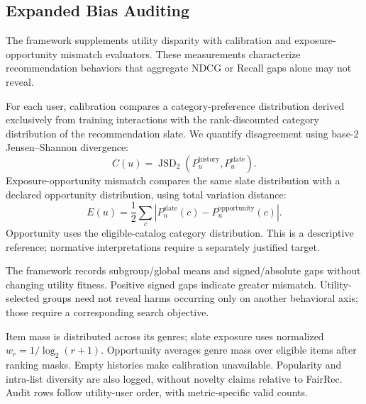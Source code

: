 \subsection{Expanded Bias Auditing}
The framework supplements utility disparity with calibration and exposure-opportunity mismatch evaluators. These measurements characterize recommendation behaviors that aggregate NDCG or Recall gaps alone may not reveal.

For each user, calibration compares a category-preference distribution derived exclusively from training interactions with the rank-discounted category distribution of the recommendation slate. We quantify disagreement using base-2 Jensen--Shannon divergence:
\begin{equation}
\label{eq:calibration}
C(u)=\operatorname{JSD}_{2}\!\left(P_u^{\mathrm{history}},P_u^{\mathrm{slate}}\right).
\end{equation}
Exposure-opportunity mismatch compares the same slate distribution with a declared opportunity distribution, using total variation distance:
\begin{equation}
\label{eq:exposure}
E(u)=\frac{1}{2}\sum_c\left|P_u^{\mathrm{slate}}(c)-P_u^{\mathrm{opportunity}}(c)\right|.
\end{equation}
Opportunity uses the eligible-catalog category distribution. This is a descriptive reference; normative interpretations require a separately justified target.

The framework records subgroup/global means and signed/absolute gaps without changing utility fitness. Positive signed gaps indicate greater mismatch. Utility-selected groups need not reveal harms occurring only on another behavioral axis; those require a corresponding search objective.


Item mass is distributed across its genres; slate exposure uses normalized $w_r=1/\log_2(r+1)$. Opportunity averages genre mass over eligible items after ranking masks. Empty histories make calibration unavailable. Popularity and intra-list diversity are also logged, without novelty claims relative to FairRec. Audit rows follow utility-user order, with metric-specific valid counts.
